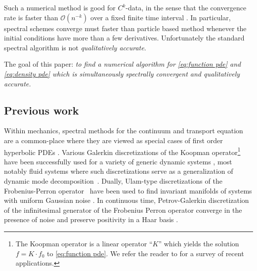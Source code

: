 \documentclass[final,leqno]{siamltex1213}
\begin{document}
Such a numerical method is good for $C^{k}$-data, in the sense that the convergence rate is faster than $\mathcal{O}(n^{-k})$ over a fixed finite time interval \cite{Gottlieb2001}.
In particular, spectral schemes converge must faster than particle based method whenever the initial conditions have more than a few derivatives.
Unfortunately the standard spectral algorithm is not \emph{qualitatively accurate}.

The goal of this paper:
\emph{to find a numerical algorithm for \eqref{eq:function pde} and \eqref{eq:density pde} which is simultaneously spectrally convergent and qualitatively accurate.}

\subsection{Previous work}
Within mechanics, spectral methods for the continuum and transport equation are a common-place where they are viewed as special cases of first order hyperbolic PDEs \cite{Boyd2001,Gottlieb2001}.
Various Galerkin discretizations of the Koopman operator\footnote{The Koopman operator is a linear operator ``$K$'' which yields the solution $f = K \cdot f_{0}$ to \eqref{eq:function pde}. We refer the reader to \cite{BudisicMohrMezic2012} for a survey of recent applications.} have been successfully used for a variety of generic dynamic systems \cite{BudisicMohrMezic2012,Mezic2005}, most notably fluid systems \cite{Rowley2009} where such discretizations serve as a generalization of dynamic mode decomposition~\cite{Schmid2010}.
Dually, Ulam-type discretizations of the Frobenius-Perron operator~\cite{Ulam1947,LasotaMackey1994} have been used to find invariant manifolds of systems with uniform Gaussian noise \cite{FroylandJungeKoltai2013,FroylandPadberg2009}.
In continuous time, Petrov-Galerkin discretization of the infinitesimal generator of the Frobenius Perron operator converge in the presence of noise \cite{BittracherKoltaiJunge2015} and preserve positivity in a Haar basis \cite{koltai2011thesis}.
\end{document}
